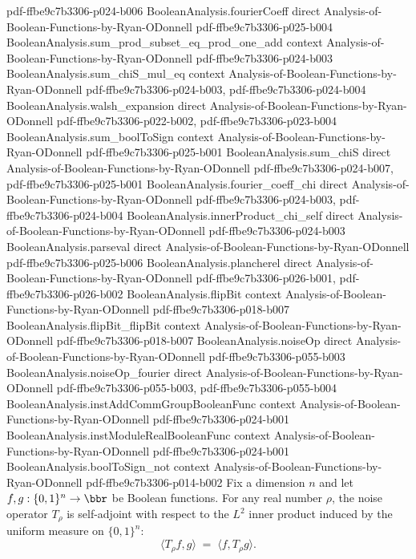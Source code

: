 \begin{lemma}
{    pdf-ffbe9c7b3306-p024-b006}
\proofstep
  {BooleanAnalysis.fourierCoeff}
  {direct}
  {Analysis-of-Boolean-Functions-by-Ryan-ODonnell}
  {pdf-ffbe9c7b3306-p025-b004}
\proofstep
  {BooleanAnalysis.sum_prod_subset_eq_prod_one_add}
  {context}
  {Analysis-of-Boolean-Functions-by-Ryan-ODonnell}
  {pdf-ffbe9c7b3306-p024-b003}
\proofstep
  {BooleanAnalysis.sum_chiS_mul_eq}
  {context}
  {Analysis-of-Boolean-Functions-by-Ryan-ODonnell}
  {pdf-ffbe9c7b3306-p024-b003,
    pdf-ffbe9c7b3306-p024-b004}
\proofstep
  {BooleanAnalysis.walsh_expansion}
  {direct}
  {Analysis-of-Boolean-Functions-by-Ryan-ODonnell}
  {pdf-ffbe9c7b3306-p022-b002,
    pdf-ffbe9c7b3306-p023-b004}
\proofstep
  {BooleanAnalysis.sum_boolToSign}
  {context}
  {Analysis-of-Boolean-Functions-by-Ryan-ODonnell}
  {pdf-ffbe9c7b3306-p025-b001}
\proofstep
  {BooleanAnalysis.sum_chiS}
  {direct}
  {Analysis-of-Boolean-Functions-by-Ryan-ODonnell}
  {pdf-ffbe9c7b3306-p024-b007,
    pdf-ffbe9c7b3306-p025-b001}
\proofstep
  {BooleanAnalysis.fourier_coeff_chi}
  {direct}
  {Analysis-of-Boolean-Functions-by-Ryan-ODonnell}
  {pdf-ffbe9c7b3306-p024-b003,
    pdf-ffbe9c7b3306-p024-b004}
\proofstep
  {BooleanAnalysis.innerProduct_chi_self}
  {direct}
  {Analysis-of-Boolean-Functions-by-Ryan-ODonnell}
  {pdf-ffbe9c7b3306-p024-b003}
\proofstep
  {BooleanAnalysis.parseval}
  {direct}
  {Analysis-of-Boolean-Functions-by-Ryan-ODonnell}
  {pdf-ffbe9c7b3306-p025-b006}
\proofstep
  {BooleanAnalysis.plancherel}
  {direct}
  {Analysis-of-Boolean-Functions-by-Ryan-ODonnell}
  {pdf-ffbe9c7b3306-p026-b001,
    pdf-ffbe9c7b3306-p026-b002}
\proofstep
  {BooleanAnalysis.flipBit}
  {context}
  {Analysis-of-Boolean-Functions-by-Ryan-ODonnell}
  {pdf-ffbe9c7b3306-p018-b007}
\proofstep
  {BooleanAnalysis.flipBit_flipBit}
  {context}
  {Analysis-of-Boolean-Functions-by-Ryan-ODonnell}
  {pdf-ffbe9c7b3306-p018-b007}
\proofstep
  {BooleanAnalysis.noiseOp}
  {direct}
  {Analysis-of-Boolean-Functions-by-Ryan-ODonnell}
  {pdf-ffbe9c7b3306-p055-b003}
\proofstep
  {BooleanAnalysis.noiseOp_fourier}
  {direct}
  {Analysis-of-Boolean-Functions-by-Ryan-ODonnell}
  {pdf-ffbe9c7b3306-p055-b003,
    pdf-ffbe9c7b3306-p055-b004}
\proofstep
  {BooleanAnalysis.instAddCommGroupBooleanFunc}
  {context}
  {Analysis-of-Boolean-Functions-by-Ryan-ODonnell}
  {pdf-ffbe9c7b3306-p024-b001}
\proofstep
  {BooleanAnalysis.instModuleRealBooleanFunc}
  {context}
  {Analysis-of-Boolean-Functions-by-Ryan-ODonnell}
  {pdf-ffbe9c7b3306-p024-b001}
\proofstep
  {BooleanAnalysis.boolToSign_not}
  {context}
  {Analysis-of-Boolean-Functions-by-Ryan-ODonnell}
  {pdf-ffbe9c7b3306-p014-b002}
Fix a dimension $n$ and let $f, g : \{0,1\}^n \to \bbr$ be Boolean functions. For any
real number $\rho$, the noise operator $T_\rho$ is self-adjoint with respect to the
$L^2$ inner product induced by the uniform measure on $\{0,1\}^n$:
\[
  \langle T_\rho f, g\rangle \;=\; \langle f, T_\rho g\rangle.
\]
\end{lemma}

